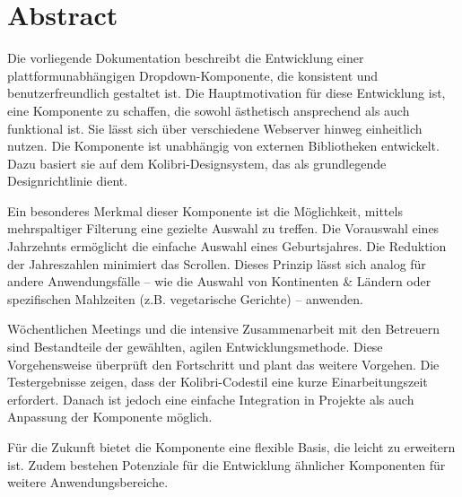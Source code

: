 \chapter*{Abstract}

Die vorliegende Dokumentation beschreibt die Entwicklung einer plattformunabhängigen Dropdown-Komponente, die konsistent und benutzerfreundlich gestaltet ist. 
Die Hauptmotivation für diese Entwicklung ist, eine Komponente zu schaffen, die sowohl ästhetisch ansprechend als auch funktional ist. 
Sie lässt sich über verschiedene Webserver hinweg einheitlich nutzen. 
Die Komponente ist unabhängig von externen Bibliotheken entwickelt. 
Dazu basiert sie auf dem Kolibri-Designsystem, das als grundlegende Designrichtlinie dient.

Ein besonderes Merkmal dieser Komponente ist die Möglichkeit, mittels mehrspaltiger Filterung eine gezielte Auswahl zu treffen. 
Die Vorauswahl eines Jahrzehnts ermöglicht die einfache Auswahl eines Geburtsjahres. 
Die Reduktion der Jahreszahlen minimiert das Scrollen.
Dieses Prinzip lässt sich analog für andere Anwendungsfälle – wie die Auswahl von Kontinenten \& Ländern oder spezifischen Mahlzeiten (z.B. vegetarische Gerichte) – anwenden.

Wöchentlichen Meetings und die intensive Zusammenarbeit mit den Betreuern sind Bestandteile der gewählten, agilen Entwicklungsmethode.
Diese Vorgehensweise überprüft den Fortschritt und plant das weitere Vorgehen.
Die Testergebnisse zeigen, dass der Kolibri-Codestil eine kurze Einarbeitungszeit erfordert.
Danach ist jedoch eine einfache Integration in Projekte als auch Anpassung der Komponente möglich.

Für die Zukunft bietet die Komponente eine flexible Basis, die leicht zu erweitern ist. 
Zudem bestehen Potenziale für die Entwicklung ähnlicher Komponenten für weitere Anwendungsbereiche.
